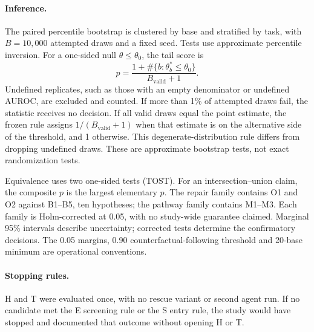 \paragraph{Inference.}
The paired percentile bootstrap is clustered by base and stratified by task, with $B = 10{,}000$ attempted
draws and a fixed seed. Tests use approximate percentile inversion. For a one-sided null
$\theta \leq \theta_0$, the tail score is
\[
  p = \frac{1 + \#\{b : \theta_b^* \leq \theta_0\}}{B_{\mathrm{valid}} + 1}.
\]
Undefined replicates, such as those with an empty denominator or undefined AUROC, are excluded and counted.
If more than 1\% of attempted draws fail, the statistic receives no decision. If all valid draws equal the
point estimate, the frozen rule assigns $1/(B_{\mathrm{valid}}+1)$ when that estimate is on the alternative
side of the threshold, and 1 otherwise. This degenerate-distribution rule differs from dropping undefined
draws. These are approximate bootstrap tests, not exact randomization tests.

Equivalence uses two one-sided tests (TOST). For an intersection--union claim, the composite $p$ is the
largest elementary $p$. The repair family contains O1 and O2 against B1--B5, ten hypotheses; the pathway
family contains M1--M3. Each family is Holm-corrected at 0.05, with no study-wide guarantee claimed.
Marginal 95\% intervals describe uncertainty; corrected tests determine the confirmatory decisions.
The 0.05 margins, 0.90 counterfactual-following threshold and 20-base minimum are operational conventions.

\paragraph{Stopping rules.}
H and T were evaluated once, with no rescue variant or second agent run. If no candidate met the E screening
rule or the S entry rule, the study would have stopped and documented that outcome without opening H or T.
